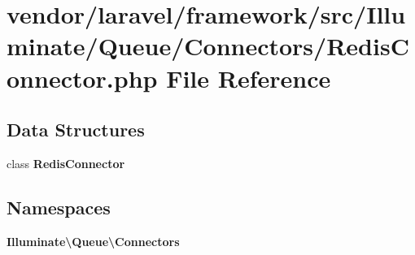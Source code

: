 \section{vendor/laravel/framework/src/\+Illuminate/\+Queue/\+Connectors/\+Redis\+Connector.php File Reference}
\label{_redis_connector_8php}
\subsection*{Data Structures}
\begin{DoxyCompactItemize}
\item 
class {\bf Redis\+Connector}
\end{DoxyCompactItemize}
\subsection*{Namespaces}
\begin{DoxyCompactItemize}
\item 
 {\bf Illuminate\textbackslash{}\+Queue\textbackslash{}\+Connectors}
\end{DoxyCompactItemize}
